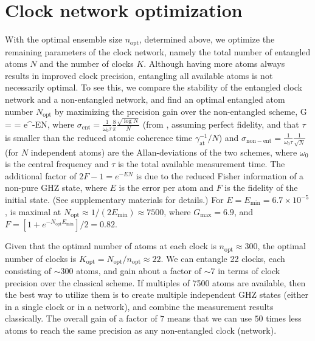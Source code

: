 \section{Clock network optimization}
With the optimal ensemble size $n_\mathrm{opt}$, determined above, we optimize the
remaining parameters of the clock network, namely the total number of entangled
atoms $N$ and the number of clocks $K$. Although having more atoms always
results in improved clock precision, entangling all available atoms is not
necessarily optimal. To see this, we compare the stability of the entangled
clock network and a non-entangled network, and find an optimal entangled atom
number $N_\mathrm{opt}$ by maximizing the precision gain over the non-entangled
scheme,
\bel
\label{eq:gainKomar2015}
	G =  =
	e^{-EN},
\eel 
where $\sigma_\mathrm{ent} = \frac{1}{\omega_0 \tau}\frac{8}{\pi}\frac{\sqrt{\log
N}}{N}$ (from \cite{Komar2014}, assuming perfect fidelity, and that $\tau$ is
smaller than the reduced atomic coherence time $\gamma_\mathrm{at}^{-1}/N$) and
$\sigma_\mathrm{non-ent} = \frac{1}{\omega_0\tau}\frac{1}{\sqrt{N}}$ (for $N$
independent atoms) are the Allan-deviations of the two schemes, where $\omega_0$
is the central frequency and $\tau$ is the total available measurement time.
The additional factor of $2F-1 = e^{-EN}$ is due to the reduced Fisher
information of a non-pure GHZ state, where $E$ is the error per atom and $F$
is the fidelity of the initial state.
(See supplementary materials for details.) For $E = E_\mathrm{min} = 6.7\times
10^{-5}$,  is maximal at $N_\mathrm{opt} \approx
1/(2E_\mathrm{min}) \approx 7500$, where $G_\mathrm{max} = 6.9$, and $F =
[1+e^{-N_\mathrm{opt} E_\mathrm{min}}]/2 = 0.82$.

Given that the optimal number of atoms at each clock is $n_\mathrm{opt} \approx
300$, the optimal number of clocks is $K_\mathrm{opt} = N_\mathrm{opt} /
n_\mathrm{opt} \approx 22$. We can entangle 22 clocks, each consisting of $\sim
300$ atoms, and gain about  a factor of $\sim 7$ in terms of clock precision
over the classical scheme. If multiples of 7500 atoms are available, then the
best way to utilize them is to create multiple independent GHZ states (either in
a single clock or in a network), and combine the measurement results
classically. The overall gain of a factor of $7$ means that we can use $50$
times less atoms to reach the same precision as any non-entangled clock
(network). 

